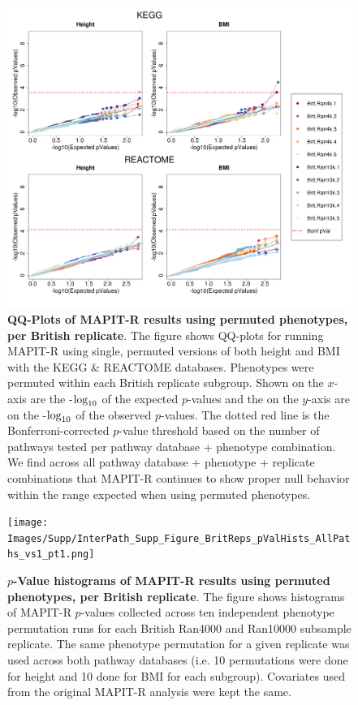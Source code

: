 \documentclass[12pt,a4paper]{article}
\def\log{{\rm log}}
\begin{document}
\begin{figure}[htbp]
\centering
\includegraphics[scale=.35]{Images/Supp/InterPath_Supp_Figure_BritReps_perm1_QQPlots_AllPaths_vs1.png}
\caption[TBD]{\textbf{QQ-Plots of MAPIT-R results using permuted phenotypes, per British replicate}. The figure shows QQ-plots for running MAPIT-R using single, permuted versions of both height and BMI with the KEGG \& REACTOME databases. Phenotypes were permuted within each British replicate subgroup. Shown on the $x$-axis are the -$\log_{10}$ of the expected $p$-values and the on the $y$-axis are on the -$\log_{10}$ of the observed $p$-values. The dotted red line is the Bonferroni-corrected $p$-value threshold based on the number of pathways tested per pathway database + phenotype combination. We find across all pathway database + phenotype + replicate combinations that MAPIT-R continues to show proper null behavior within the range expected when using permuted phenotypes.}
\label{InterPath-Supp-Figure-BritReps-perm1-QQPlots-AllPaths}
\end{figure}
\clearpage

\setlength{\footskip}{1cm}
\begin{figure}[htbp]
\centering
\vspace*{-1cm}
\texttt{[image: Images/Supp/InterPath\_Supp\_Figure\_BritReps\_pValHists\_AllPaths\_vs1\_pt1.png]}
\caption[TBD]{\textbf{$p$-Value histograms of MAPIT-R results using permuted phenotypes, per British replicate}. The figure shows histograms of MAPIT-R $p$-values collected across ten independent phenotype permutation runs for each British Ran4000 and Ran10000 subsample replicate. The same phenotype permutation for a given replicate was used across both pathway databases (i.e. 10 permutations were done for height and 10 done for BMI for each subgroup). Covariates used from the original MAPIT-R analysis were kept the same.}
\label{InterPath-Supp-Figure-BritReps-10perms-pValHists-pt1}
\end{figure}
\clearpage
\setlength{\footskip}{1cm}
\addtocounter{figure}{-1}
\end{document}
